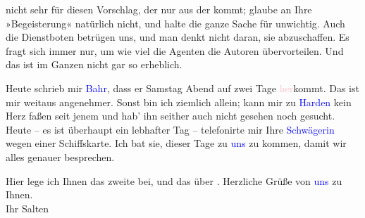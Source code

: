                nicht sehr für diesen Vorschlag, der nur aus der \label{K_L03416-7v}\label{K_L03416-7h} kommt; glaube an Ihre
               »Begeisterung« natürlich nicht, und halte die ganze Sache für unwichtig. Auch die
               Dienstboten betrügen uns, und man denkt nicht daran, sie abzuschaffen. Es fragt sich
               immer nur, um wie viel die Agenten die Autoren übervorteilen. Und das ist im Ganzen
               nicht gar so erheblich.\pend
           
\pstart
           Heute schrieb mir \textcolor{blue}{Bahr}{}\ledrightnote{\textcolor{blue}{Hermann Bahr}}, dass er Samstag{ }Abend auf zwei Tage \textcolor{pink}{her}{}\ledrightnote{{$\rightarrow$}\textcolor{pink}{Berlin}}kommt. Das ist mir weitaus angenehmer. Sonst bin ich ziemlich allein;
               kann mir zu \textcolor{blue}{Harden}{}\ledrightnote{\textcolor{blue}{Maximilian Harden}} kein Herz faßen seit jenem
                  \label{K_L03416-8v}\label{K_L03416-8h} und
                  hab’ ihn seither auch nicht gesehen noch gesucht. Heute – es ist überhaupt ein lebhafter Tag – telefonirte
               mir Ihre \textcolor{blue}{Schwägerin}{}\ledrightnote{{$\rightarrow$}\textcolor{blue}{Elisabeth Steinrück}} wegen
               einer Schiffskarte. Ich bat sie, dieser Tage zu \textcolor{blue}{uns}{}\ledrightnote{{$\rightarrow$}\textcolor{blue}{Ottilie Salten}} zu kommen, damit wir alles genauer besprechen.\pend
           
\pstart
           Hier lege ich Ihnen das zweite \label{K_L03416-9v}\label{K_L03416-9h} bei, und das
               über \label{K_L03416-10v}\label{K_L03416-10h}. Herzliche Grüße von \textcolor{blue}{uns}{}\ledrightnote{{$\rightarrow$}\textcolor{blue}{Ottilie Salten}} zu Ihnen.{\\}Ihr
                  \spacefill\mbox{Salten}\pend
           \endnumbering{}  
      